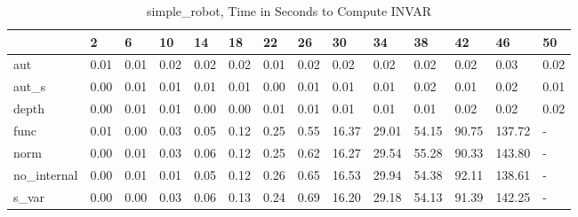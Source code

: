 \begin{table}
\caption{simple_robot, Time in Seconds to Compute INVAR}
\label{simple_robot_INVAR_time}
\begin{tabular}{llllllllllllll}
\toprule
 & 2 & 6 & 10 & 14 & 18 & 22 & 26 & 30 & 34 & 38 & 42 & 46 & 50 \\
\midrule
aut & 0.01 & 0.01 & 0.02 & 0.02 & 0.02 & 0.01 & 0.02 & 0.02 & 0.02 & 0.02 & 0.02 & 0.03 & 0.02 \\
aut_s & 0.00 & 0.01 & 0.01 & 0.01 & 0.01 & 0.00 & 0.01 & 0.01 & 0.01 & 0.02 & 0.01 & 0.02 & 0.01 \\
depth & 0.00 & 0.01 & 0.01 & 0.00 & 0.00 & 0.01 & 0.01 & 0.01 & 0.01 & 0.01 & 0.02 & 0.02 & 0.02 \\
func & 0.01 & 0.00 & 0.03 & 0.05 & 0.12 & 0.25 & 0.55 & 16.37 & 29.01 & 54.15 & 90.75 & 137.72 & - \\
norm & 0.00 & 0.01 & 0.03 & 0.06 & 0.12 & 0.25 & 0.62 & 16.27 & 29.54 & 55.28 & 90.33 & 143.80 & - \\
no_internal & 0.00 & 0.01 & 0.01 & 0.05 & 0.12 & 0.26 & 0.65 & 16.53 & 29.94 & 54.38 & 92.11 & 138.61 & - \\
s_var & 0.00 & 0.00 & 0.03 & 0.06 & 0.13 & 0.24 & 0.69 & 16.20 & 29.18 & 54.13 & 91.39 & 142.25 & - \\
\bottomrule
\end{tabular}
\end{table}
